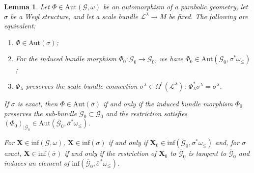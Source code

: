 \documentclass[pdftex]{sigma}
\def\Gbdle{\mathcal{G}}
\theoremstyle{plain}
\newtheorem{Lemma}[Theorem]{Lemma}
\theoremstyle{definition}
\begin{document}
\begin{Lemma} \label{inessential automorphisms TFAE} Let $\Phi \in \mathrm{Aut}(\Gbdle,\omega)$ be an automorphism of a parabolic geometry, let $\sigma$ be a Weyl structure, and let a scale bundle $\mathcal{L}^{\lambda} \rightarrow M$ be fixed. The following are equivalent:
\begin{enumerate}\itemsep=0pt
\item[$(i)$] $\Phi \in \mathrm{Aut}(\sigma)$;
\item[$(ii)$] For the induced bundle morphism $\Phi_0: \Gbdle_0 \rightarrow \Gbdle_0$, we have $\Phi_0 \in \mathrm{Aut}(\Gbdle_0,\sigma^*\omega_{\leq})$;
\item[$(iii)$] $\Phi_{\lambda}$ preserves the scale bundle connection $\sigma^{\lambda} \in \Omega^1(\mathcal{L}^{\lambda})$: $\Phi_{\lambda}^*\sigma^{\lambda} = \sigma^{\lambda}$.
\end{enumerate}

 If $\sigma$ is exact, then $\Phi \in \mathrm{Aut}(\overline{\sigma})$ if and only if the induced bundle morphism $\Phi_0$ preserves the sub-bundle $\overline{\Gbdle}_0 \subset \Gbdle_0$ and the restriction satisfies $(\Phi_0)_{\vert \overline{\Gbdle}_0} \in \mathrm{Aut}(\overline{\Gbdle}_0,\overline{\sigma}^*\omega_{\leq})$.

For $\mathbf{X} \in \mathrm{inf}(\Gbdle,\omega)$, $\mathbf{X} \in \mathrm{inf}(\sigma)$ if and only if $\mathbf{X}_0 \in \mathrm{inf}(\Gbdle_0,\sigma^*\omega_{\leq})$ and, for $\sigma$ exact, $\mathbf{X} \in \mathrm{inf}(\overline{\sigma})$ if and only if the restriction of $\mathbf{X}_0$ to $\overline{\Gbdle}_0$ is tangent to $\overline{\Gbdle}_0$ and induces an element of $\mathrm{inf}(\overline{\Gbdle}_0,\overline{\sigma}^*\omega_{\leq})$.
\end{Lemma}
\end{document}
